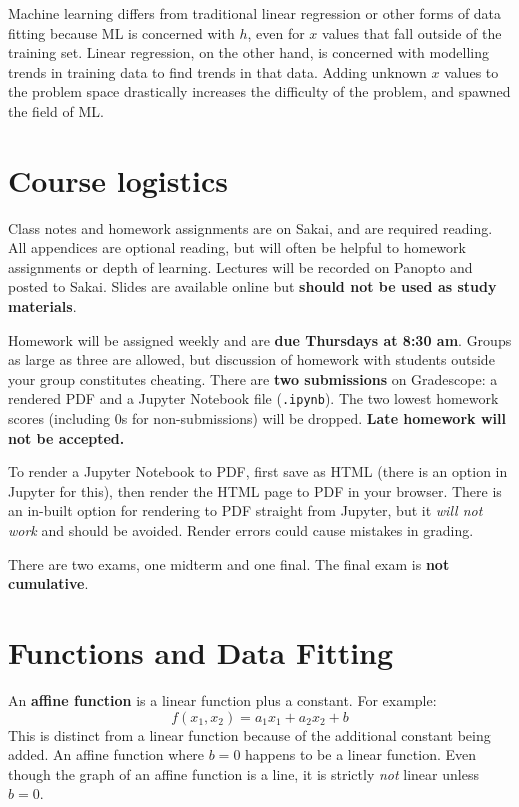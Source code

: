 \documentclass[titlepage, 12pt, leqno]{article}
\begin{document}
Machine learning differs from traditional linear regression or other forms of
data fitting because ML is concerned with $h$, even for $x$ values that fall
outside of the training set. Linear regression, on the other hand, is concerned
with modelling trends in training data to find trends in that data. Adding 
unknown $x$ values to the problem space drastically increases the difficulty of 
the problem, and spawned the field of ML.

\pagebreak
\section{Course logistics}

Class notes and homework assignments are on Sakai, and are required reading. All
appendices are optional reading, but will often be helpful to homework assignments
or depth of learning. Lectures will be recorded on Panopto and posted to Sakai.
Slides are available online but \textbf{should not be used as study materials}.

Homework will be assigned weekly and are \textbf{due Thursdays at 8:30 am}. 
Groups as large as three are allowed, but discussion of homework with students
outside your group constitutes cheating. There are \textbf{two submissions} on
Gradescope: a rendered PDF and a Jupyter Notebook file (\texttt{.ipynb}). The
two lowest homework scores (including 0s for non-submissions) will be dropped.
\textbf{Late homework will not be accepted.}

\begin{note}
    To render a Jupyter Notebook to PDF, first save as HTML (there is an option
    in Jupyter for this), then render the HTML page to PDF in your browser. There
    is an in-built option for rendering to PDF straight from Jupyter, but it
    \textit{will not work} and should be avoided. Render errors could cause 
    mistakes in grading.
\end{note}

There are two exams, one midterm and one final. The final exam is \textbf{not
cumulative}.

\pagebreak
\section{Functions and Data Fitting}

\begin{definition}
    An \textbf{affine function} is a linear function plus a constant. For 
    example:
    \[
        f(x_1, x_2) = a_1x_1 + a_2x_2 + b
    \]
    This is distinct from a linear function because of the additional constant
    being added. An affine function where $b=0$ happens to be a linear function.
    Even though the graph of an affine function is a line, it is strictly
    \textit{not} linear unless $b=0$.
\end{definition}
\end{document}
